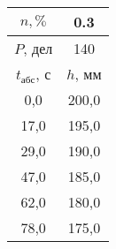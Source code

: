 \begin{tabular}[t]{|c|c|}
\hline
$n, \%$ & 0.3 \\
\hline
$P$, дел & 140 \\
\hline
$t_{абс}$, с & $h$, мм \\ 
\hline
0,0 & 200,0 \\ 
17,0 & 195,0 \\ 
29,0 & 190,0 \\ 
47,0 & 185,0 \\ 
62,0 & 180,0 \\ 
78,0 & 175,0 \\ 
\hline
\end{tabular}